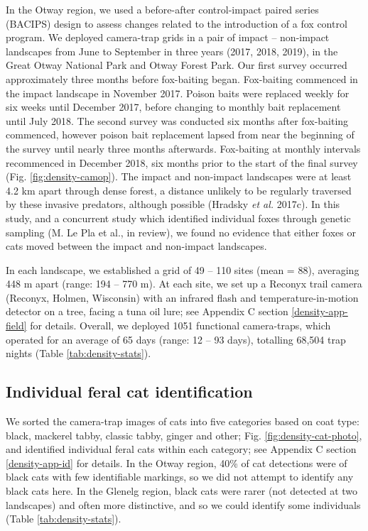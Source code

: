\documentclass[11pt,a4paper,titlepage,twoside,openright]{style/unimelbthesis}
\begin{document}
\begin{mainmatter}
In the Otway region, we used a before-after control-impact paired series (BACIPS) design to assess changes related to the introduction of a fox control program. We deployed camera-trap grids in a pair of impact -- non-impact landscapes from June to September in three years (2017, 2018, 2019), in the Great Otway National Park and Otway Forest Park. Our first survey occurred approximately three months before fox-baiting began. Fox-baiting commenced in the impact landscape in November 2017. Poison baits were replaced weekly for six weeks until December 2017, before changing to monthly bait replacement until July 2018. The second survey was conducted six months after fox-baiting commenced, however poison bait replacement lapsed from near the beginning of the survey until nearly three months afterwards. Fox-baiting at monthly intervals recommenced in December 2018, six months prior to the start of the final survey (Fig. \ref{fig:density-camop}). The impact and non-impact landscapes were at least 4.2 km apart through dense forest, a distance unlikely to be regularly traversed by these invasive predators, although possible (Hradsky \emph{et al.} 2017c). In this study, and a concurrent study which identified individual foxes through genetic sampling (M. Le Pla et al., in review), we found no evidence that either foxes or cats moved between the impact and non-impact landscapes.

In each landscape, we established a grid of 49 -- 110 sites (mean = 88), averaging 448 m apart (range: 194 -- 770 m). At each site, we set up a Reconyx trail camera (Reconyx, Holmen, Wisconsin) with an infrared flash and temperature-in-motion detector on a tree, facing a tuna oil lure; see Appendix C section \ref{density-app-field} for details. Overall, we deployed 1051 functional camera-traps, which operated for an average of 65 days (range: 12 -- 93 days), totalling 68,504 trap nights (Table \ref{tab:density-stats}).

\hypertarget{individual-feral-cat-identification}{%
\subsection{Individual feral cat identification}\label{individual-feral-cat-identification}}

We sorted the camera-trap images of cats into five categories based on coat type: black, mackerel tabby, classic tabby, ginger and other; Fig. \ref{fig:density-cat-photo}, and identified individual feral cats within each category; see Appendix C section \ref{density-app-id} for details. In the Otway region, 40\% of cat detections were of black cats with few identifiable markings, so we did not attempt to identify any black cats here. In the Glenelg region, black cats were rarer (not detected at two landscapes) and often more distinctive, and so we could identify some individuals (Table \ref{tab:density-stats}).


\end{mainmatter}
\end{document}
